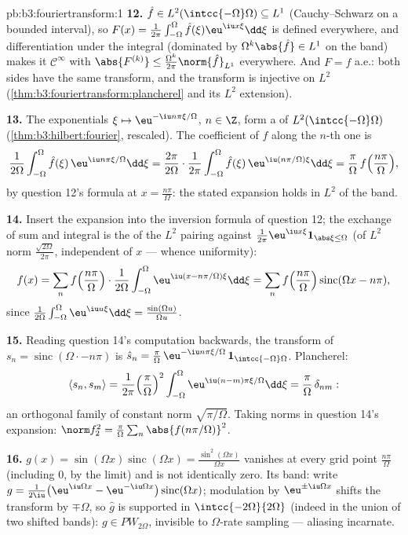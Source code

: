 \begin{solution}{pb:b3:fouriertransform:1}
\textbf{12.} $\hat f \in L^2(\intcc{-\Omega}\Omega)
\subseteq L^1$ (Cauchy--Schwarz on a bounded interval), so
$F(x) = \frac1{2\pi}\int_{-\Omega}^\Omega\hat
f(\xi)\eu^{\iu x\xi}\dd\xi$ is defined everywhere, and
differentiation under the integral (dominated by
$\Omega^k\abs{\hat f} \in L^1$ on the band) makes it
$\mathcal C^\infty$ with $\abs{F^{(k)}} \leq
\frac{\Omega^k}{2\pi}\norm{\hat f}_{L^1}$ everywhere. And $F
= f$ a.e.: both sides have the same transform, and the
transform is injective on $L^2$
(\cref{thm:b3:fouriertransform:plancherel} and its
$L^2$ extension).

\textbf{13.} The exponentials $\xi \mapsto \eu^{-\iu
n\pi\xi/\Omega}$, $n \in \Z$, form a  of
$L^2(\intcc{-\Omega}\Omega)$
(\cref{thm:b3:hilbert:fourier}, rescaled). The coefficient
of $\hat f$ along the $n$-th one is
\[
\frac1{2\Omega}\int_{-\Omega}^\Omega\hat f(\xi)\,
\eu^{\iu n\pi\xi/\Omega}\dd\xi
= \frac{2\pi}{2\Omega}\cdot
\frac1{2\pi}\int_{-\Omega}^{\Omega}\hat f(\xi)\,
\eu^{\iu(n\pi/\Omega)\xi}\dd\xi
= \frac\pi\Omega\,f\Bigl(\frac{n\pi}\Omega\Bigr),
\]
by question 12's formula at $x = \frac{n\pi}\Omega$: the
stated expansion holds in $L^2$ of the band.

\textbf{14.} Insert the expansion into the inversion formula
of question 12; the exchange of sum and integral is the
 of the $L^2$ pairing against $\frac1{2\pi}
\eu^{\iu x\xi}\mathbf 1_{\abs\xi\leq\Omega}$ (of $L^2$ norm
$\frac{\sqrt{2\Omega}}{2\pi}$, independent of $x$ ---
whence uniformity):
\[
f(x) = \sum_nf\Bigl(\frac{n\pi}\Omega\Bigr)\cdot
\frac1{2\Omega}\int_{-\Omega}^\Omega
\eu^{\iu(x - n\pi/\Omega)\xi}\dd\xi
= \sum_nf\Bigl(\frac{n\pi}\Omega\Bigr)
\operatorname{sinc}(\Omega x - n\pi),
\]
since $\frac1{2\Omega}\int_{-\Omega}^\Omega\eu^{\iu
u\xi}\dd\xi = \frac{\sin(\Omega u)}{\Omega u}$.

\textbf{15.} Reading question 14's computation backwards,
the transform of $s_n = \operatorname{sinc}(\Omega\cdot -
n\pi)$ is $\hat s_n = \frac\pi\Omega\,\eu^{-\iu
n\pi\xi/\Omega}\,\mathbf 1_{\intcc{-\Omega}\Omega}$.
Plancherel:
\[
\langle s_n, s_m\rangle = \frac1{2\pi}
\Bigl(\frac\pi\Omega\Bigr)^2\int_{-\Omega}^\Omega
\eu^{\iu(n-m)\pi\xi/\Omega}\dd\xi =
\frac\pi\Omega\,\delta_{nm} :
\]
an orthogonal family of constant norm
$\sqrt{\pi/\Omega}$. Taking norms in question 14's
expansion: $\norm f_2^2 =
\frac\pi\Omega\sum_n\abs{f(n\pi/\Omega)}^2$.

\textbf{16.} $g(x) = \sin(\Omega x)\operatorname{sinc}
(\Omega x) = \frac{\sin^2(\Omega x)}{\Omega x}$ vanishes at
every grid point $\frac{n\pi}\Omega$ (including $0$, by the
limit) and is not identically zero. Its band: write $g =
\frac1{2\iu}\bigl(\eu^{\iu\Omega x} - \eu^{-\iu\Omega
x}\bigr)\operatorname{sinc}(\Omega x)$; modulation by
$\eu^{\pm\iu\Omega x}$ shifts the transform by
$\mp\Omega$, so $\hat g$ is supported in
$\intcc{-2\Omega}{2\Omega}$ (indeed in the union of two
shifted bands): $g \in PW_{2\Omega}$, invisible to
$\Omega$-rate sampling --- aliasing incarnate.


\end{solution}
